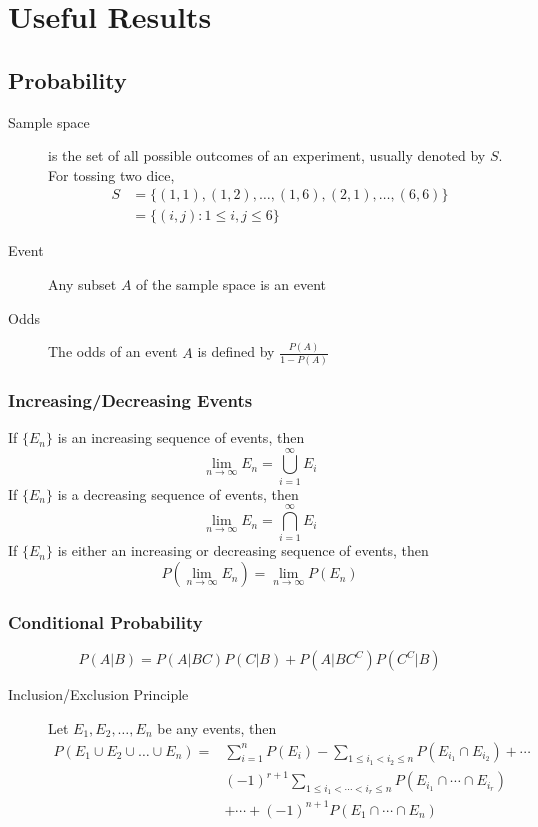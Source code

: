 \documentclass{article}
\begin{document}
\section{Useful Results}
\begin{multicols}{2}
\subsection{Probability}
\begin{description}
 \item[Sample space] is the set of all possible outcomes of an experiment, usually denoted by $S$. For tossing two dice,
 \begin{equation*}
 \begin{split}
 S &= \{(1,1),(1,2),\dots,(1,6),(2,1),\dots,(6,6)\} \\
 &= \{(i,j): 1 \leq i,j\leq 6\}
 \end{split}
 \end{equation*}
 \item[Event] Any subset $A$ of the sample space is an event
 \item[Odds] The odds of an event $A$ is defined by $\frac{P(A)}{1-P(A)}$
\end{description}
 \subsubsection*{Increasing/Decreasing Events}
 If $\{E_n\}$ is an increasing sequence of events, then $$\lim_{n\rightarrow \infty} E_n = \bigcup_{i=1}^{\infty}E_i$$
 If $\{E_n\}$ is a decreasing sequence of events, then $$\lim_{n\rightarrow \infty} E_n = \bigcap_{i=1}^{\infty}E_i$$
 If $\{E_n\}$ is either an increasing or decreasing sequence of events, then
 $$P(\lim_{n\rightarrow \infty}E_n) = \lim_{n\rightarrow \infty}P(E_n)$$
\subsubsection*{Conditional Probability}
$$P(A|B) = P(A|BC)P(C|B) + P(A|BC^C)P(C^C|B)$$
\end{multicols}
\begin{description}
\item[Inclusion/Exclusion Principle] Let $E_1, E_2, \dots, E_n$ be any events, then
 \begin{equation*}
 \begin{split}
  P(E_1 \cup E_2 \cup \dots \cup E_n) = &\sum_{i=1}^{n}P(E_i) - \sum_{1 \leq i_1 < i_2 \leq n} P(E_{i_1} \cap E_{i_2}) + \cdots\\
  & (-1)^{r+1}\sum_{1\leq i_1 < \cdots < i_r \leq n} P(E_{i_1} \cap \cdots \cap E_{i_r})\\
  &+\cdots +  (-1)^{n+1}P(E_1 \cap \cdots \cap E_n)
 \end{split}
 \end{equation*}
\end{description}
\end{document}
